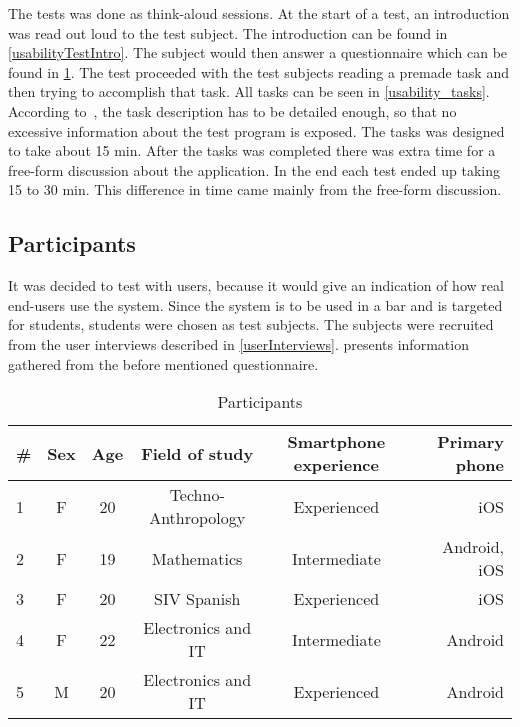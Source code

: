 The tests was done as think-aloud sessions. At the start of a test, an introduction was read out loud to the test
subject. The introduction can be found in
\cref{usabilityTestIntro}. The subject would then answer a
questionnaire which can be found in \cref{tab:participants}. The test
proceeded with the test subjects reading a premade task and then
trying to accomplish that task. All tasks can be seen in \cref{usability_tasks}. According to~\cite{RubinChisnellSpool08}, the task description has to be detailed enough, so that no excessive information about the test program is exposed. The tasks was designed to take about 15 min. After the tasks was completed there was extra time for a free-form discussion about the application. In the end each test ended up taking 15 to 30 min. This difference in time came mainly from the free-form discussion.

\subsection{Participants}
It was decided to test with users, because it would give an indication
of how real end-users use the system. Since the system is to be used
in a bar and is targeted for students, students were chosen as test
subjects. The subjects were recruited from the user interviews
described in \cref{userInterviews}.  presents
information gathered from the before mentioned questionnaire.

\begin{table}[hbtp]
\begin{tabular}{lccccr}
\toprule
\textbf{\#} & \textbf{Sex} & \textbf{Age} & \textbf{Field of study} &
\textbf{Smartphone experience} & \textbf{Primary phone} \\
\midrule
1                   & F               & 20           & Techno-Anthropology       & Experienced                    & iOS                    \\
2                   & F               & 19           & Mathematics             & Intermediate                   & Android, iOS           \\
3                   & F               & 20           & SIV Spanish             & Experienced                    & iOS                    \\
4                   & F               & 22           & Electronics and IT      & Intermediate                   & Android                \\
5                   & M               & 20           & Electronics and
IT      & Experienced                    & Android                \\
\bottomrule
\end{tabular}
\caption{Participants}\label{tab:participants}
\end{table}

